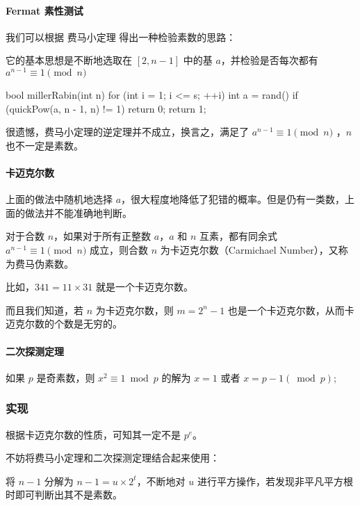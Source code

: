 \paragraph{Fermat 素性测试}

我们可以根据  费马小定理  得出一种检验素数的思路：

它的基本思想是不断地选取在 $[2, n-1]$ 中的基 $a$，并检验是否每次都有 $a^{n-1} \equiv 1 \pmod n$

\begin{cppcode}
bool millerRabin(int n) {
  for (int i = 1; i <= s; ++i) {
    int a = rand() %
    if (quickPow(a, n - 1, n) != 1) return 0;
  }
  return 1;
}
\end{cppcode}

很遗憾，费马小定理的逆定理并不成立，换言之，满足了 $a^{n-1} \equiv 1 \pmod n$ ，$n$ 也不一定是素数。

\paragraph{卡迈克尔数}

上面的做法中随机地选择 $a$，很大程度地降低了犯错的概率。但是仍有一类数，上面的做法并不能准确地判断。

对于合数 $n$，如果对于所有正整数 $a$，$a$ 和 $n$ 互素，都有同余式 $a^{n-1} \equiv 1 \pmod n$ 成立，则合数 $n$ 为卡迈克尔数（Carmichael Number），又称为费马伪素数。

比如，$341 = 11 \times 31$ 就是一个卡迈克尔数。

而且我们知道，若 $n$ 为卡迈克尔数，则 $m=2^{n}-1$ 也是一个卡迈克尔数，从而卡迈克尔数的个数是无穷的。

\paragraph{二次探测定理}

如果 $p$ 是奇素数，则 $x^2 \equiv 1 \bmod p$ 的解为 $x = 1$ 或者 $x = p - 1 (\bmod p)$;

\subsubsection{实现}

根据卡迈克尔数的性质，可知其一定不是 $p^e$。

不妨将费马小定理和二次探测定理结合起来使用：

将 $n−1$ 分解为 $n−1=u \times 2^t$，不断地对 $u$ 进行平方操作，若发现非平凡平方根时即可判断出其不是素数。

